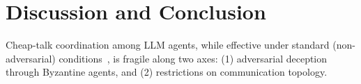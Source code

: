 \documentclass[runningheads]{llncs}
\begin{document}

\section{Discussion and Conclusion}\label{sec:discussion}

Cheap-talk coordination among LLM agents, while effective under standard (non-adversarial) conditions~\cite{madmoun2026communication}, is fragile along two axes: (1) adversarial deception through Byzantine agents, and (2) restrictions on communication topology.
\end{document}
